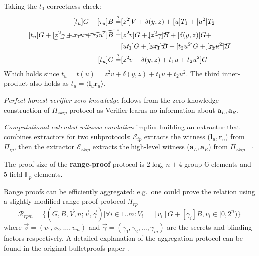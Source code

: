 \documentclass[../lecture-notes-148x210.tex]{subfiles}
\begin{document}
Taking the $t_0$ correctness check:
\begin{equation*}
    \begin{aligned}
        [t_u]G + [\tau_u]B \stackrel{\text{?}}{=}& [z^2]V + \delta(y,z) + [u]T_1 + [u^2]T_2\\
        [t_u]G + \cancel{[z^2\gamma + \tau_1 u + \tau_2 u^2]B} \stackrel{?}{=}& [z^2 v]G + \cancel{[z^2 \gamma]B} +[\delta(y,z)]G + \\
        & [ut_1]G + \cancel{[u\tau_1]B} + [t_2 u^2] G + \cancel{[\tau_2 u^2]B} \\
        [t_u]G \stackrel{?}{=}& [z^2v + \delta(y,z) + t_1u + t_2u^2]G
    \end{aligned}
\end{equation*}
Which holds since $t_u = t(u) = z^2v + \delta(y,z) + t_1u + t_2u^2$. The third inner-product also holds as $t_u = \langle \mathbf{l}_u \mathbf{r}_u \rangle$.

\textit{Perfect honest-verifier zero-knowledge} follows from the zero-knowledge construction of $\Pi_{zkip}$ protocol as Verifier learns no information about $\mathbf{a}_L, \mathbf{a}_R$.

\textit{Computational extended witness emulation} implies building an extractor that combines extractors for two subprotocols: $\mathcal{E}_{ip}$ extracts the witness ($\mathbf{l}_u, \mathbf{r}_u$) from $\Pi_{ip}$, then the extractor $\mathcal{E}_{zkip}$ extracts the high-level witness ($\mathbf{a}_L, \mathbf{a}_R$) from $\Pi_{zkip} \quad \square$

The proof size of the \textbf{range-proof} protocol is $2 \log_2n +4$ group $\mathbb{G}$ elements and $5$ field $\mathbb{F}_p$ elements.
\begin{remark}
    Range proofs can be efficiently aggregated: e.g.\ one could prove the relation using a slightly modified range proof protocol $\Pi_{rp}$
    $$\mathcal{R}_{rpm} = \{ (G, B, \vec{V}, n; \vec{v}, \vec{\gamma}) \vert \forall i \in 1..m: V_i = [v_i]G + [\gamma_i]B, v_i \in [0, 2^n) \}$$
    where $\vec{v} = (v_1, v_2, \dots, v_m)$ and $\vec{\gamma} = (\gamma_1, \gamma_2, \dots, \gamma_m)$ are the secrets and blinding factors respectively. A detailed explanation of the aggregation protocol can be found in the original bulletproofs paper \cite{bulletproofs}.
\end{remark}
\end{document}
